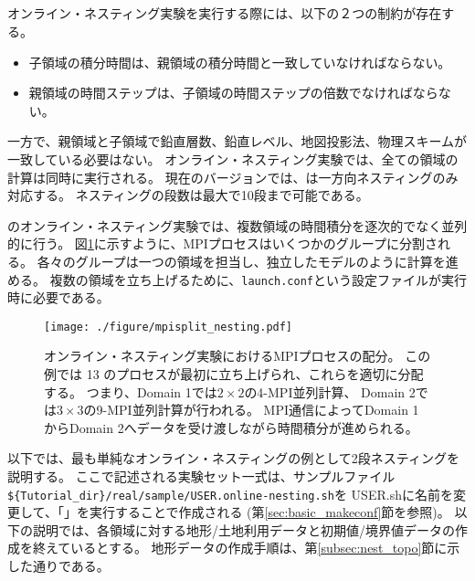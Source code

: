 \subsection{\SubsecOnlineNesting} \label{subsec:nest_online}

オンライン・ネスティング実験を実行する際には、以下の２つの制約が存在する。
\begin{itemize}
\item 子領域の積分時間は、親領域の積分時間と一致していなければならない。
\item 親領域の時間ステップは、子領域の時間ステップの倍数でなければならない。
\end{itemize}
一方で、親領域と子領域で鉛直層数、鉛直レベル、地図投影法、物理スキームが一致している必要はない。
オンライン・ネスティング実験では、全ての領域の計算は同時に実行される。
現在のバージョンでは、\scalerm は一方向ネスティングのみ対応する。
ネスティングの段数は最大で10段まで可能である。

\scalerm のオンライン・ネスティング実験では、複数領域の時間積分を逐次的でなく並列的に行う。
図\ref{fig_mpisplit}に示すように、MPIプロセスはいくつかのグループに分割される。
各々のグループは一つの領域を担当し、独立したモデルのように計算を進める。
複数の領域を立ち上げるために、\verb|launch.conf|という設定ファイルが実行時に必要である。

\begin{figure}[ht]
\begin{center}
  \texttt{[image: ./figure/mpisplit\_nesting.pdf]}\\
  \caption{ オンライン・ネスティング実験におけるMPIプロセスの配分。
           この例では 13 のプロセスが最初に立ち上げられ、これらを適切に分配する。
           つまり、Domain 1では$2 \times 2$の4-MPI並列計算、
           Domain 2では$3 \times 3$の9-MPI並列計算が行われる。
           MPI通信によってDomain 1からDomain 2へデータを受け渡しながら時間積分が進められる。}
  \label{fig_mpisplit}
\end{center}
\end{figure}


以下では、最も単純なオンライン・ネスティングの例として2段ネスティングを説明する。
%
ここで記述される実験セット一式は、サンプルファイル
\verb|${Tutorial_dir}/real/sample/USER.online-nesting.sh|を
USER.shに名前を変更して、「\makeconftool」を実行することで作成される
(第\ref{sec:basic_makeconf}節を参照)。
以下の説明では、各領域に対する地形/土地利用データと初期値/境界値データの作成を終えているとする。
地形データの作成手順は、第\ref{subsec:nest_topo}節に示した通りである。

